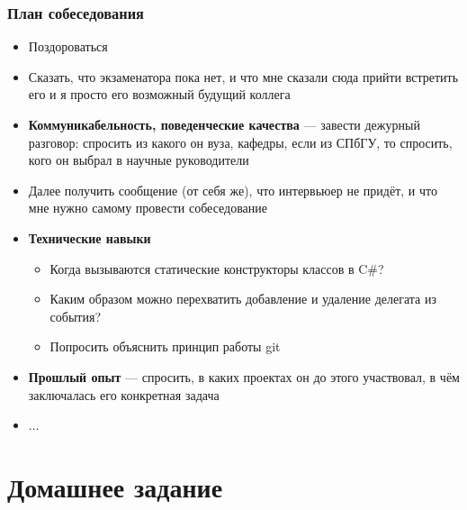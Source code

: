\documentclass{../../slides-style}
\begin{document}
    \begin{frame}
        \frametitle{План собеседования}
        \begin{small}
            \begin{itemize}
                \item Поздороваться
                \item Сказать, что экзаменатора пока нет, и что мне сказали сюда прийти встретить его и я просто его возможный будущий коллега
                \item \textbf{Коммуникабельность, поведенческие качества} --- завести дежурный разговор: спросить из какого он вуза, кафедры, если из СПбГУ, то спросить, кого он выбрал в научные руководители
                \item Далее получить сообщение (от себя же), что интервьюер не придёт, и что мне нужно самому провести собеседование
                \item \textbf{Технические навыки}
                \begin{itemize}
                    \item ​Когда вызываются статические конструкторы классов в C\#?
                    \item Каким образом можно перехватить добавление и удаление делегата из события?
                    \item Попросить объяснить принцип работы git
                \end{itemize}
                \item \textbf{Прошлый опыт} --- спросить, в каких проектах он до этого участвовал, в чём заключалась его конкретная задача
                \item ...
            \end{itemize}
        \end{small}
    \end{frame}

    \section{Домашнее задание}
\end{document}
